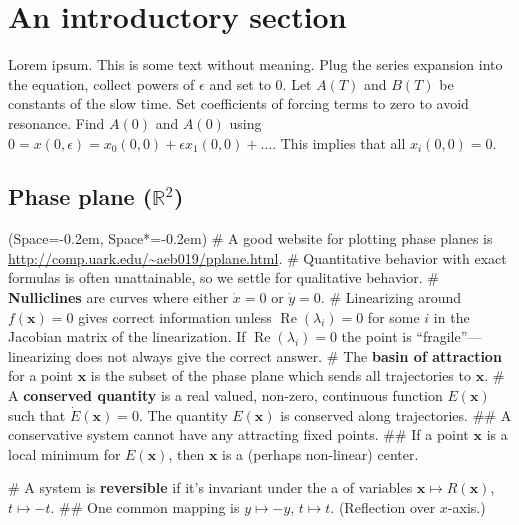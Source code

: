 \documentclass[11pt, a4paper]{article}
\newcommand{\listSpace}{-0.2em}%
\begin{document}
\section*{An introductory section}
Lorem ipsum. This is some text without meaning.
Plug the series expansion into the equation, collect powers of $\epsilon$ and set to 0.
Let $A(T)$ and $B(T)$ be constants of the slow time.
Set coefficients of forcing terms to zero to avoid resonance.
Find $A(0)$ and $A(0)$ using $0 = x(0, \epsilon) = x_0 (0, 0) + \epsilon x_1 (0, 0) + \dots$. This implies that all $x_i(0,0) = 0$.
\begin{multicols}{2}
\section*{Phase plane ($\mathbb{R}^2$)}
\begin{easylist}[itemize]
	\ListProperties(Space=\listSpace, Space*=\listSpace)
	# A good website for plotting phase planes is \url{http://comp.uark.edu/~aeb019/pplane.html}.
	# Quantitative behavior with exact formulas is often unattainable,
	so we settle for qualitative behavior.
	# \textbf{Nulliclines} are curves where either $\dot{x} = 0$ or $\dot{y} = 0$.
	# Linearizing around $f(\mathbf{x}) = 0$ gives correct information
	unless $\operatorname{Re}(\lambda_i) = 0$ for some $i$ in the Jacobian matrix
	of the linearization. If $\operatorname{Re}(\lambda_i) = 0$ the point is ``fragile''---linearizing 
	does not always give the correct answer.
	# The \textbf{basin of attraction} for a point $\textbf{x}$ is the subset of the phase plane
	which sends all trajectories to $\textbf{x}$.
	# A \textbf{conserved quantity} is a real valued, non-zero, continuous function $E(\mathbf{x})$
	such that $\dot{E}(\mathbf{x}) = 0$. The quantity $E(\mathbf{x})$ is conserved along trajectories.
	## A conservative system cannot have any attracting fixed points.
	## If a point $\mathbf{x}$ is a local minimum for $E(\mathbf{x})$,
	then $\mathbf{x}$ is a (perhaps non-linear) center.
	
	# A system is \textbf{reversible} if it's invariant under the a
	of variables $\mathbf{x} \mapsto R(\mathbf{x})$, $t \mapsto -t$.
	## One common mapping is $y \mapsto -y$, $t \mapsto t$. (Reflection over $x$-axis.)
\end{easylist}




\end{multicols}
\end{document}
